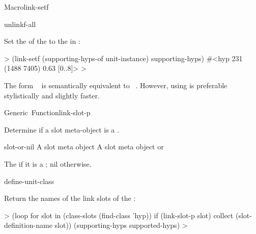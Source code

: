 \documentclass[10pt,twoside,english,pdftex]{article}
\begin{document}
\begin{functiondoc}{Macro}{link-setf}
\begin{alsos}{unlinkf-all}
\also[linkf]
\also[unlinkf]
\end{alsos}

\fnexample Set the   of the
  to the  in
:
%
\W\supp
\begin{example}
  > (link-setf (supporting-hyps-of unit-instance) supporting-hyps)
  #<hyp 231 (1488 7405) 0.63 [0..8]>
  >
\end{example}

\fnnote 
{}%
The form \mbox{ 
  } is semantically equivalent to
\mbox{
  \code{)}}.  However, using
\textbf{} is preferable stylistically and
slightly faster.

\end{functiondoc}


\begin{functiondoc}{Generic~Function}{link-slot-p}{
    \returns{} }

\fnsyntax

\fnpurpose Determine if a slot meta-object is a .

\fnmethods
{}

\fnpackage {}

\fnmodule {}

\fnargs
\begin{args}{slot-or-nil}
\arg[slot] A slot meta object
 A slot meta object or \nil{}
\end{args}

\fnreturns The  if it is a ; nil otherwise.

\begin{alsos}{define-unit-class}
\end{alsos}

\fnexample
Return the names of the link slots of the  :
%
\W\supp
\begin{example}
  > (loop for slot in (class-slots (find-class 'hyp)) 
       if (link-slot-p slot) collect (slot-definition-name slot))
  (supporting-hyps supported-hyps)
  >
\end{example}

\end{functiondoc}
\end{document}
